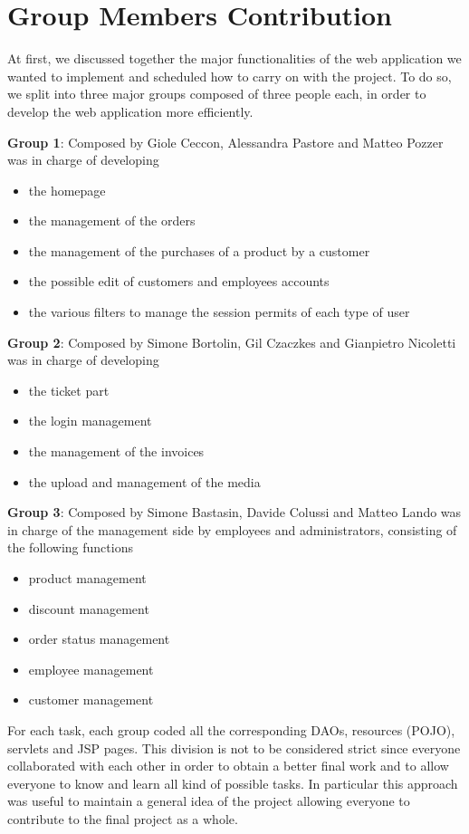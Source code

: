 \section{Group Members Contribution}

At first, we discussed together the major functionalities of the web application we wanted to implement and scheduled how to carry on with the project.
To do so, we split into three major groups composed of three people each, in order to develop the web application more efficiently.


\begin{description}
	\item \textbf{Group 1}: Composed by Giole Ceccon, Alessandra Pastore and Matteo Pozzer was in charge of developing
	\begin{itemize}
		\item the homepage
		\item the management of the orders
		\item the management of the purchases of a product by a customer
		\item the possible edit of customers and employees accounts
		\item the various filters to manage the session permits of each type of user
	\end{itemize} 
	\item \textbf{Group 2}: Composed by Simone Bortolin, Gil Czaczkes and Gianpietro Nicoletti was in charge of developing
	\begin{itemize}
		\item the ticket part
		\item the login management
		\item the management of the invoices
		\item the upload and management of the media
	\end{itemize}
	\item \textbf{Group 3}: Composed by Simone Bastasin, Davide Colussi and Matteo Lando was in charge of the management side by employees and administrators, consisting of the following functions
	\begin{itemize}
		\item product management
		\item discount management
		\item order status management
		\item employee management
		\item customer management
	\end{itemize}

For each task, each group coded all the corresponding DAOs, resources (POJO), servlets and JSP pages.
This division is not to be considered strict since everyone collaborated with each other in order to obtain a better final work 
and to allow everyone to know and learn all kind of possible tasks. 
In particular this approach was useful to maintain a general idea of the project allowing everyone to contribute to the final project as a whole.

\end{description}